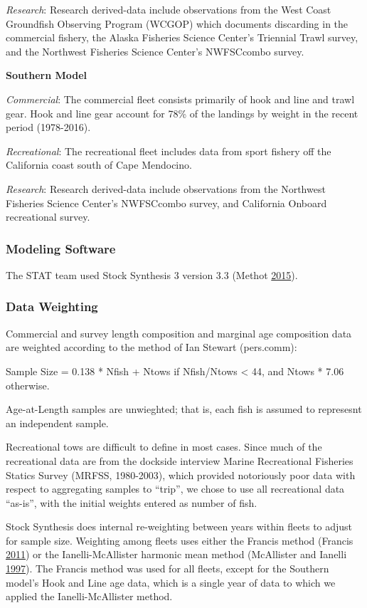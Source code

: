 \documentclass[12pt,]{article}
\begin{document}
\emph{Research}: Research derived-data include observations from the
West Coast Groundfish Observing Program (WCGOP) which documents
discarding in the commercial fishery, the Alaska Fisheries Science
Center's Triennial Trawl survey, and the Northwest Fisheries Science
Center's NWFSCcombo survey.

\textbf{Southern Model}

\emph{Commercial}: The commercial fleet consists primarily of hook and
line and trawl gear. Hook and line gear account for 78\% of the landings
by weight in the recent period (1978-2016).

\emph{Recreational}: The recreational fleet includes data from sport
fishery off the California coast south of Cape Mendocino.

\emph{Research}: Research derived-data include observations from the
Northwest Fisheries Science Center's NWFSCcombo survey, and California
Onboard recreational survey.

\subsubsection{Modeling Software}\label{modeling-software}

The STAT team used Stock Synthesis 3 version 3.3 (Methot
\protect\hyperlink{ref-Methot2015}{2015}).

\subsubsection{Data Weighting}\label{data-weighting}

Commercial and survey length composition and marginal age composition
data are weighted according to the method of Ian Stewart (pers.comm):

Sample Size = 0.138 * Nfish + Ntows if Nfish/Ntows \textless{} 44, and
Ntows * 7.06 otherwise.

Age-at-Length samples are unwieghted; that is, each fish is assumed to
represesnt an independent sample.

Recreational tows are difficult to define in most cases. Since much of
the recreational data are from the dockside interview Marine
Recreational Fisheries Statics Survey (MRFSS, 1980-2003), which provided
notoriously poor data with respect to aggregating samples to ``trip'',
we chose to use all recreational data ``as-is'', with the initial
weights entered as number of fish.

Stock Synthesis does internal re-weighting between years within fleets
to adjust for sample size. Weighting among fleets uses either the
Francis method (Francis \protect\hyperlink{ref-Francis2011}{2011}) or
the Ianelli-McAllister harmonic mean method (McAllister and Ianelli
\protect\hyperlink{ref-McAllister1997}{1997}). The Francis method was
used for all fleets, except for the Southern model's Hook and Line age
data, which is a single year of data to which we applied the
Ianelli-McAllister method.
\end{document}
